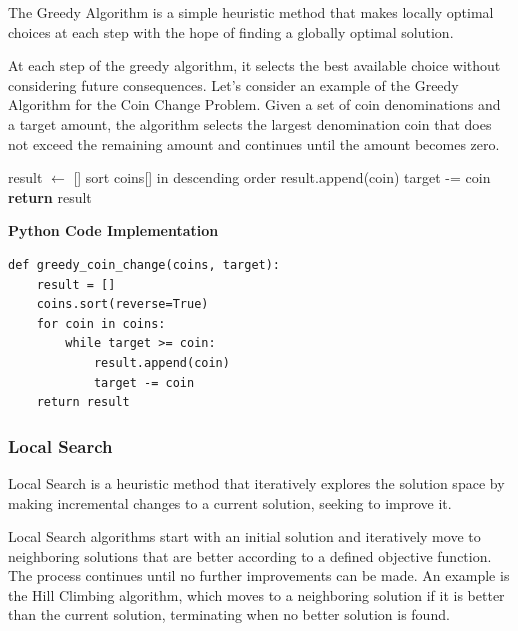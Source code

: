 \documentclass[12pt]{book} %
\begin{document}
The Greedy Algorithm is a simple heuristic method that makes locally optimal choices at each step with the hope of finding a globally optimal solution.

At each step of the greedy algorithm, it selects the best available choice without considering future consequences. Let's consider an example of the Greedy Algorithm for the Coin Change Problem. Given a set of coin denominations and a target amount, the algorithm selects the largest denomination coin that does not exceed the remaining amount and continues until the amount becomes zero.
\FloatBarrier
\begin{algorithm}
\caption{Greedy Coin Change Algorithm}\label{greedy_coin_change}
\begin{algorithmic}[1]
\State result $\gets$ []
\State sort coins[] in descending order
        \State result.append(coin)
        \State target -= coin
    \EndWhile
\EndFor
\State \textbf{return} result
\EndProcedure
\end{algorithmic}
\end{algorithm}
\FloatBarrier

\textbf{Python Code Implementation}
\FloatBarrier
\begin{lstlisting}
def greedy_coin_change(coins, target):
    result = []
    coins.sort(reverse=True)
    for coin in coins:
        while target >= coin:
            result.append(coin)
            target -= coin
    return result
\end{lstlisting}
\FloatBarrier

\subsubsection{Local Search}

Local Search is a heuristic method that iteratively explores the solution space by making incremental changes to a current solution, seeking to improve it.

Local Search algorithms start with an initial solution and iteratively move to neighboring solutions that are better according to a defined objective function. The process continues until no further improvements can be made. An example is the Hill Climbing algorithm, which moves to a neighboring solution if it is better than the current solution, terminating when no better solution is found.
\end{document}
